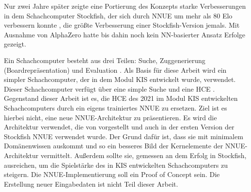 Nur zwei Jahre später zeigte eine Portierung des Konzepts starke Verbesserungen in dem Schachcomputer Stockfish, der sich durch \ac{NNUE} um mehr als 80 Elo verbessern konnte \cite{StockfishIntroducingNNUE}, die größte Verbesserung einer Stockfish-Version jemals. Mit Ausnahme von AlphaZero \cite{Silver2017} hatte bis dahin noch kein \ac{NN}-basierter Ansatz Erfolge gezeigt.


Ein Schachcomputer besteht aus drei Teilen: Suche, Zuggenerierung (Boardrepräsentation) und Evaluation \cite{VazquezFernandez2013}. Als Basis für diese Arbeit wird ein simpler Schachcomputer, der in dem Modul \ac{KIS} entwickelt wurde, verwendet. Dieser Schachcomputer verfügt über eine simple Suche und eine \ac{HCE} \cite{nopy}. Gegenstand dieser Arbeit ist es, die \ac{HCE} des 2021 im Modul \ac{KIS} entwickelten Schachcomputers durch ein eigens trainiertes \ac{NNUE} zu ersetzen. Ziel ist es hierbei nicht, eine neue \ac{NNUE}-Architektur zu präsentieren. Es wird die Architektur verwendet, die von \citeauthor{YNasu2018} \cite{YNasu2018} vorgestellt und auch in der ersten Version der Stockfish \ac{NNUE} verwendet wurde. Der Grund dafür ist, dass sie mit minimalem Domänenwissen auskommt und so ein besseres Bild der Kernelemente der \ac{NNUE}-Architektur vermittelt. Außerdem sollte sie, gemessen an dem Erfolg in Stockfish, ausreichen, um die Spielstärke des in \ac{KIS} entwickelten Schachcomputers zu steigern. Die \ac{NNUE}-Implementierung soll ein Proof of Concept sein. Die Erstellung neuer Eingabedaten ist nicht Teil dieser Arbeit.